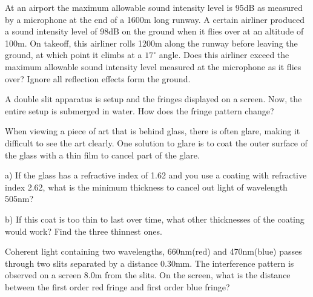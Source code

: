 \documentclass[10pt]{article}
\newenvironment{problem}[2][Problem]{\begin{trivlist}
\item[\hskip \labelsep {\bfseries #1}\hskip \labelsep {\bfseries #2.}]}{\end{trivlist}}
\begin{document}
\begin{problem}{6}
At an airport the maximum allowable sound intensity level is 95dB as measured by a microphone at the end of a 1600m long runway. A certain airliner produced a sound intensity level of 98dB on the ground when it flies over at an altitude of 100m. On takeoff, this airliner rolls 1200m along the runway before leaving the ground, at which point it climbs at a $17^\circ$ angle. Does this airliner exceed the maximum allowable sound intensity level measured at the microphone as it flies over? Ignore all reflection effects form the ground.
\end{problem}

\begin{problem}{7}
A double slit apparatus is setup and the fringes displayed on a screen. Now, the entire setup is submerged in water. How does the fringe pattern change?
\end{problem}

\begin{problem}{8}
When viewing a piece of art that is behind glass, there is often glare, making it difficult to see the art clearly. One solution to glare is to coat the outer surface of the glass with a thin film to cancel part of the glare.
\item a) If the glass has a refractive index of 1.62 and you use a coating with refractive index 2.62, what is the minimum thickness to cancel out light of wavelength 505nm?
\item b) If this coat is too thin to last over time, what other thicknesses of the coating would work? Find the three thinnest ones.
\end{problem}

\begin{problem}{9}
Coherent light containing two wavelengths, 660nm(red) and 470nm(blue) passes through two slits separated by a distance 0.30mm. The interference pattern is observed on a screen 8.0m from the slits. On the screen, what is the distance between the first order red fringe and first order blue fringe?
\end{problem}



\end{document}
